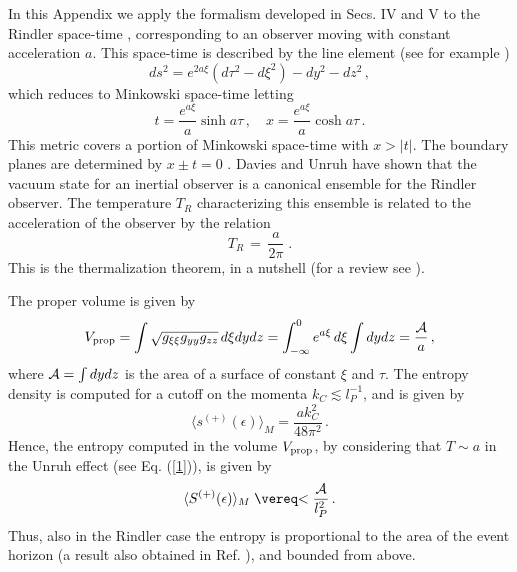 \appendixb

 In this Appendix we apply the formalism developed in
Secs. IV and V to the Rindler space-time \cite{rindler},
corresponding to an observer moving with constant acceleration
$a$. This space-time is described by the line element (see for
example \cite{birrell})
\begin{equation}\label{rindler}
  ds^2=e^{2a\xi}(d\tau^2-d\xi^2)-dy^2-dz^2\,,
\end{equation}
which reduces to Minkowski space-time letting
 \begin{equation}
 t=\frac{e^{a\xi}}{a}\sinh a\tau\,, \quad x=\frac{e^{a\xi}}{a}\cosh
 a\tau\,.
 \end{equation}
This metric covers a portion of Minkowski space-time with $x>\vert
t\vert$. The boundary planes are determined by $x\pm t=0$
\cite{rindler}. Davies \cite{Davies:1974th} and Unruh
\cite{Unruh:db} have shown that the vacuum state for an inertial
observer is a canonical ensemble for the Rindler observer. The
temperature $T_R$ characterizing  this ensemble is related to the
acceleration of the observer by the relation
\begin{equation}\label{1}
T_R\,=\,\frac{a}{2\pi} \;.
\end{equation}
This is the thermalization theorem, in a nutshell (for a review
see \cite{TAK}).

 The proper volume is given by
 \begin{equation}
 V_{\rm prop}= \int \sqrt{g_{\xi\xi} g_{yy} g_{zz}} \, d\xi dy dz =
 \int_{-\infty}^0 e^{a\xi}\,d\xi \int dy dz = \frac{\cal A}{a} \,,
 \end{equation}
where ${\cal A} = \int dy dz$ is the area of a surface of constant
$\xi$ and $\tau$. The entropy density is computed for a cutoff on
the momenta $k_C \lesssim l_P^{-1}$, and is given by
 \begin{equation}
\langle s^{(+)} (\epsilon) \rangle_M = \frac{a k_C^2}{48 \pi^2}
\,.
 \end{equation}
Hence, the entropy computed in the volume $V_{\rm prop}$, by
considering that $T\sim a$ in the Unruh effect (see Eq.
(\ref{1})), is given by
 \begin{equation}
\langle S^{(+)}(\epsilon)\rangle_M \lesssim \frac{\cal A}{l_P^2}
\,.
 \end{equation}
Thus, also in the Rindler case the entropy is proportional to the
area of the event horizon (a result also obtained in Ref.
\cite{Laflamme:ec,Terashima:1999vw}), and bounded from above.

